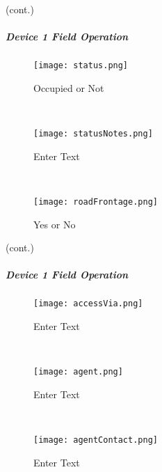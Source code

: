 {\footnotesize (cont.)}
\vspace{.8in}

\vspace{2in}

\vspace{3in}

\clearpage
  
  
\subparagraph*{Device 1 Field Operation}
\begin{wrapfigure}{r}{0.4\textwidth}
\centering
    \texttt{[image: status.png]}
\caption {Occupied or Not}
\vspace{.05in}

\HRule \\[.4cm] %
\vspace{.05in}

    \texttt{[image: statusNotes.png]}
\caption{Enter Text}
\vspace{.05in}

\HRule \\[.4cm] %
\vspace{.05in}

    \texttt{[image: roadFrontage.png]}
\caption{Yes or No}
\end{wrapfigure}

{\footnotesize (cont.)}
\vspace{.8in}


\vspace{2.7in}

\vspace{2.5in}

\clearpage
\subparagraph*{Device 1 Field Operation}
\begin{wrapfigure}{r}{0.4\textwidth}
\centering
    \texttt{[image: accessVia.png]}
\caption {Enter Text}
\vspace{.05in}

\HRule \\[.4cm] %
\vspace{.05in}

    \texttt{[image: agent.png]}
\caption{Enter Text}
\vspace{.05in}

\HRule \\[.4cm] %
\vspace{.05in}

    \texttt{[image: agentContact.png]}
\caption{Enter Text}
\end{wrapfigure}

